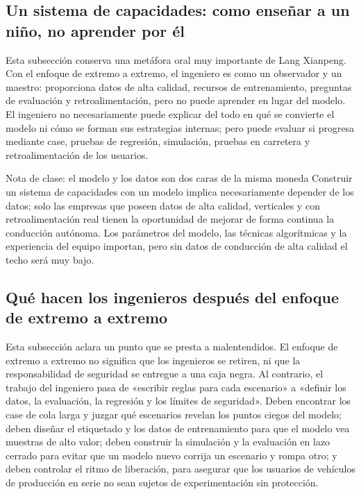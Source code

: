 \documentclass[a4paper]{article}
\begin{document}
\subsection{Un sistema de capacidades: como enseñar a un niño, no aprender por él}

Esta subsección conserva una metáfora oral muy importante de Lang Xianpeng. Con el enfoque de extremo a extremo, el ingeniero es como un observador y un maestro: proporciona datos de alta calidad, recursos de entrenamiento, preguntas de evaluación y retroalimentación, pero no puede aprender en lugar del modelo. El ingeniero no necesariamente puede explicar del todo en qué se convierte el modelo ni cómo se forman sus estrategias internas; pero puede evaluar si progresa mediante case, pruebas de regresión, simulación, pruebas en carretera y retroalimentación de los usuarios.

\begin{importantbox}{Nota de clase: el modelo y los datos son dos caras de la misma moneda}
Construir un sistema de capacidades con un modelo implica necesariamente depender de los datos; solo las empresas que poseen datos de alta calidad, verticales y con retroalimentación real tienen la oportunidad de mejorar de forma continua la conducción autónoma. Los parámetros del modelo, las técnicas algorítmicas y la experiencia del equipo importan, pero sin datos de conducción de alta calidad el techo será muy bajo.
\end{importantbox}

\subsection{Qué hacen los ingenieros después del enfoque de extremo a extremo}

Esta subsección aclara un punto que se presta a malentendidos. El enfoque de extremo a extremo no significa que los ingenieros se retiren, ni que la responsabilidad de seguridad se entregue a una caja negra. Al contrario, el trabajo del ingeniero pasa de «escribir reglas para cada escenario» a «definir los datos, la evaluación, la regresión y los límites de seguridad». Deben encontrar los case de cola larga y juzgar qué escenarios revelan los puntos ciegos del modelo; deben diseñar el etiquetado y los datos de entrenamiento para que el modelo vea muestras de alto valor; deben construir la simulación y la evaluación en lazo cerrado para evitar que un modelo nuevo corrija un escenario y rompa otro; y deben controlar el ritmo de liberación, para asegurar que los usuarios de vehículos de producción en serie no sean sujetos de experimentación sin protección.
\end{document}
